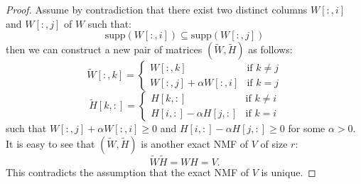 \begin{proof}
Assume by contradiction that there exist two distinct columns $W[:,i]$ and $W[:,j]$ of $W$ such that:
\begin{equation}
    \text{supp}(W[:,i]) \subseteq \text{supp}(W[:,j])
\end{equation}
then we can construct a new pair of matrices $(\tilde{W}, \tilde{H})$ as follows:
\begin{equation}
    \tilde{W}[:,k] = 
    \begin{cases}
        W[:,k] & \text{if } k \neq j \\
        W[:,j] + \alpha W[:,i] & \text{if } k = j
    \end{cases}
\end{equation}
\begin{equation}
    \tilde{H}[k,:] = 
    \begin{cases}
        H[k,:] & \text{if } k \neq i \\
        H[i,:] - \alpha H[j,:] & \text{if } k = i
    \end{cases}
\end{equation} 
such that $W[:,j] + \alpha W[:,i] \geq 0$ and $H[i,:] - \alpha H[j,:] \geq 0$ for some $\alpha > 0$.
It is easy to see that $(\tilde{W}, \tilde{H})$ is another exact NMF of $V$ of size $r$:
\begin{equation}
    \tilde{W} \tilde{H} = W H = V.
\end{equation}
This contradicts the assumption that the exact NMF of $V$ is unique.
\end{proof}

